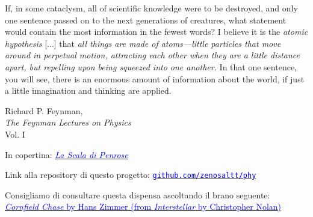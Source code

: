 \epigraph{If, in some cataclysm, all of scientific knowledge were
to be destroyed, and only one sentence passed on to the next generations
of creatures, what statement would contain the most information in the
fewest words? I believe it is the \textit{atomic hypothesis} [...]
that \textit{all things are made of atoms—little particles that move
around in perpetual motion, attracting each other when they are a little
distance apart, but repelling upon being squeezed into one another.}
In that one sentence, you will see, there is an enormous amount of
information about the world, if just a little imagination and
thinking are applied.}{Richard P. Feynman,\\\textit{The Feynman Lectures on Physics}\\Vol. I}

\vspace*{5cm}

\begin{center}
    In copertina: \href{https://en.wikipedia.org/wiki/Penrose_stairs}{\textcolor{blue}{\textit{La Scala di Penrose}}}
\end{center}
\begin{center}
    Link alla repository di questo progetto: \href{https://github.com/zenosaltt/phy}{\faGithub \space \textcolor{blue}{\texttt{github.com/zenosaltt/phy}}}
\end{center}

\vspace*{4cm}

\begin{center}
Consigliamo di consultare questa dispensa ascoltando il brano seguente:\\
\href{https://www.youtube.com/watch?v=JuSsvM8B4Jc}{\textcolor{blue}{\textit{Cornfield Chase} by Hans Zimmer (from \textit{Interstellar} by Christopher Nolan)}}
\end{center}